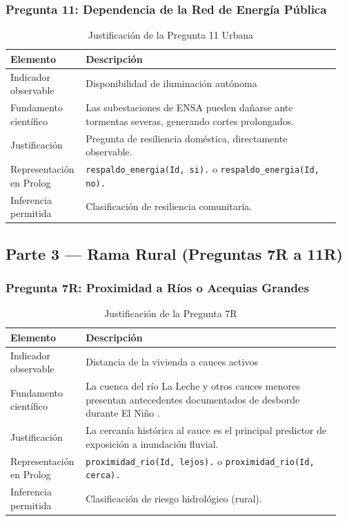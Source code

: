 \documentclass[12pt, letterpaper]{article}
\begin{document}
\subsubsection*{Pregunta 11: Dependencia de la Red de Energía Pública}
\begin{table}[H]
\centering
\caption{Justificación de la Pregunta 11 Urbana}
\label{tab:p11u}
\begin{tabular}{@{}p{0.2\linewidth}p{0.75\linewidth}@{}}
\toprule
\textbf{Elemento} & \textbf{Descripción} \\ \midrule
Indicador observable & Disponibilidad de iluminación autónoma \\
Fundamento científico & Las subestaciones de ENSA pueden dañarse ante tormentas severas, generando cortes prolongados. \\
Justificación & Pregunta de resiliencia doméstica, directamente observable. \\
Representación en Prolog & \texttt{respaldo\_energia(Id, si).} o \texttt{respaldo\_energia(Id, no).} \\
Inferencia permitida & Clasificación de resiliencia comunitaria. \\ \bottomrule
\end{tabular}
\end{table}

\subsection{Parte 3 — Rama Rural (Preguntas 7R a 11R)}

\subsubsection*{Pregunta 7R: Proximidad a Ríos o Acequias Grandes}
\begin{table}[H]
\centering
\caption{Justificación de la Pregunta 7R}
\label{tab:p7r}
\begin{tabular}{@{}p{0.2\linewidth}p{0.75\linewidth}@{}}
\toprule
\textbf{Elemento} & \textbf{Descripción} \\ \midrule
Indicador observable & Distancia de la vivienda a cauces activos \\
Fundamento científico & La cuenca del río La Leche y otros cauces menores presentan antecedentes documentados de desborde durante El Niño \parencite{gob_regional_lambayeque_2023}. \\
Justificación & La cercanía histórica al cauce es el principal predictor de exposición a inundación fluvial. \\
Representación en Prolog & \texttt{proximidad\_rio(Id, lejos).} o \texttt{proximidad\_rio(Id, cerca).} \\
Inferencia permitida & Clasificación de riesgo hidrológico (rural). \\ \bottomrule
\end{tabular}
\end{table}
\end{document}
